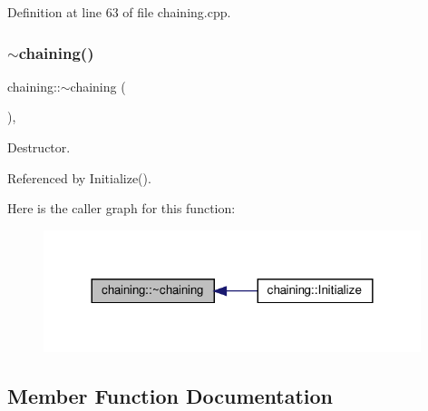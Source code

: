 Definition at line 63 of file chaining.\+cpp.

\mbox{\label{classchaining_a131b44b5f5d80bd73e7536531e5af86d}} 
\subsubsection{\texorpdfstring{$\sim$chaining()}{~chaining()}}
{\footnotesize\ttfamily chaining\+::$\sim$chaining (\begin{DoxyParamCaption}{ }\end{DoxyParamCaption})\hspace{0.3cm}{\ttfamily [override]}, {\ttfamily [default]}}



Destructor. 



Referenced by Initialize().

Here is the caller graph for this function\+:
\nopagebreak
\begin{figure}[H]
\begin{center}
\leavevmode
\includegraphics[width=312pt]{d5/d13/classchaining_a131b44b5f5d80bd73e7536531e5af86d_icgraph}
\end{center}
\end{figure}


\subsection{Member Function Documentation}
\mbox{\label{classchaining_a4cb9e1dd2c6227b9570f4af04cdb4bac}} 
